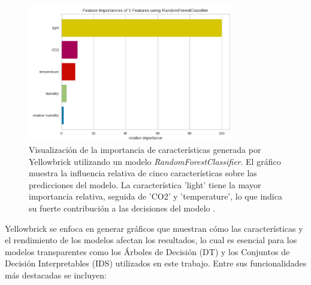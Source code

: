 \begin{figure}[H]
        \centering
        \includegraphics[width=0.8\textwidth]{include/yellowbrick.png}
        \caption{Visualización de la importancia de características generada por Yellowbrick utilizando un modelo \textit{RandomForestClassifier}. El gráfico muestra la influencia relativa de cinco características sobre las predicciones del modelo. La característica 'light' tiene la mayor importancia relativa, seguida de 'CO2' y 'temperature', lo que indica su fuerte contribución a las decisiones del modelo \cite{bengfort_yellowbrick_2018}.}
        \label{fig:yellowbrick_importance}
    \end{figure}

Yellowbrick se enfoca en generar gráficos que muestran cómo las características y el rendimiento de los modelos afectan los resultados, lo cual es esencial para los modelos transparentes como los Árboles de Decisión (DT) y los Conjuntos de Decisión Interpretables (IDS) utilizados en este trabajo. Entre sus funcionalidades más destacadas se incluyen:

